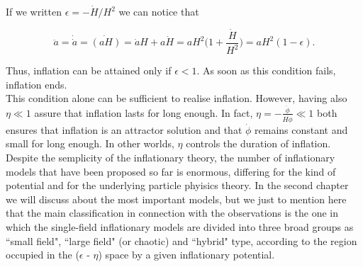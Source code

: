 \documentclass[11pt,a4paper,twoside]{book}
\begin{document}
If we written $ \epsilon = - \dot{H}/H^{2} $ we can notice that

\begin{equation}
	\label{scaleFactorParameter}
	\ddot{a}=\dot{\dot{a}}=\dot{(aH)}=\dot{a}H + a\dot{H}=aH^{2}\Big (1+\frac{\dot{H}}{H^{2}}\Big ) = aH^{2}(1-\epsilon) .
\end{equation} 

Thus, inflation can be attained only if $\epsilon < 1$. As soon as this condition fails, inflation ends.\\
This condition alone can be sufficient to realise inflation. However, having also $\eta \ll 1 $  assure that inflation lasts for long enough. In fact, $ \eta = - \frac{\ddot{\phi}}{H\dot{\phi}}  \ll 1 $ both ensures that inflation is an attractor solution and that $\dot{\phi}$ remains constant and small for long enough. In other worlds, $\eta$ controls the duration of inflation.\\

Despite the semplicity of the inflationary theory, the number of inflationary models that have been proposed so far is enormous, differing for the kind of potential and for the underlying particle phyisics theory. In the second chapter we will discuss about the most important models, but we just to mention here that the main classification in connection with the observations is the one in which the single-field inflationary models are divided into three broad groups as \textquotedblleft small field", \textquotedblleft large field" (or chaotic) and \textquotedblleft hybrid" type, according to the region occupied in the ($\epsilon$ - $\eta$) space by a given inflationary potential.\\
\end{document}
